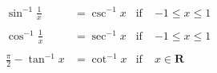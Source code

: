 \begin{equation}
\begin{aligned}
    \sin^{-1}\frac{1}{x} &= \csc^{-1}x & \text{if}\; & -1 \leq x \leq 1 \\
    &\\
    \cos^{-1}\frac{1}{x} &= \sec^{-1}x & \text{if}\; & -1 \leq x \leq 1 \\
    &\\
    \frac{\pi}{2} - \tan^{-1}x &= \cot^{-1}x & \text{if}\; & x \in \mathbf{R} \\
\end{aligned}
\end{equation}